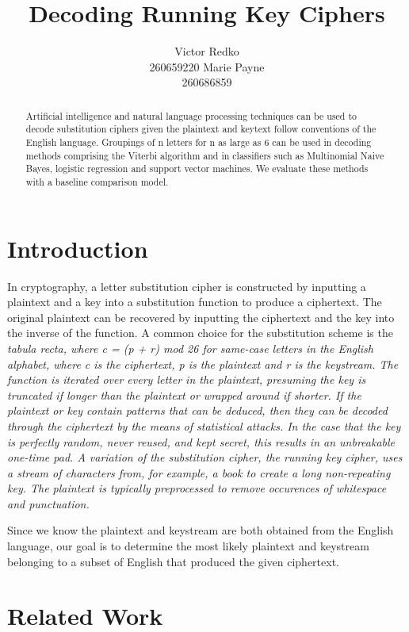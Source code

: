 \documentclass[11pt,letterpaper]{article}
\title{Decoding Running Key Ciphers}
\author{Victor Redko\\
	    260659220
	  \And
	Marie Payne\\
  	260686859}
\date{}
\begin{document}
\maketitle

\begin{abstract}
 
 Artificial intelligence and natural language processing techniques can be used to decode substitution ciphers given the plaintext and keytext follow conventions of the English language. Groupings of n letters for n as large as 6 can be used in decoding methods comprising the Viterbi algorithm and in classifiers such as Multinomial Naive Bayes, logistic regression and support vector machines. We evaluate these methods with a baseline comparison model.
 
\end{abstract}

\section{Introduction}

In cryptography, a letter substitution cipher is constructed by inputting a plaintext and a key into a substitution function to produce a ciphertext. The original plaintext can be recovered by inputting the ciphertext and the key into the inverse of the function. A common choice for the substitution scheme is the \em tabula recta, \em where c = (p + r) mod 26 for same-case letters in the English alphabet, where c is the ciphertext, p is the plaintext and r is the keystream. The function is iterated over every letter in the plaintext, presuming the key is truncated if longer than the plaintext or wrapped around if shorter. If the plaintext or key contain patterns that can be deduced, then they can be decoded through the ciphertext by the means of statistical attacks. In the case that the key is perfectly random, never reused, and kept secret, this results in an unbreakable one-time pad. A variation of the substitution cipher, the running key cipher, uses a stream of characters from, for example, a book to create a long non-repeating key. The plaintext is typically preprocessed to remove occurences of whitespace and punctuation.

Since we know the plaintext and keystream are both obtained from the English language, our goal is to determine the most likely plaintext and keystream belonging to a subset of English that produced the given ciphertext. 

\section{Related Work}
\end{document}
